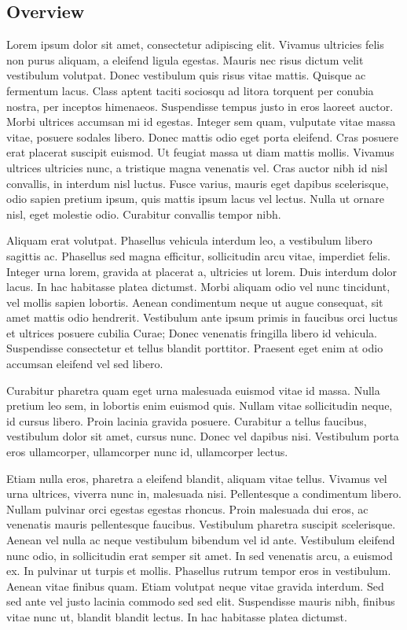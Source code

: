\documentclass[12pt,letterpaper]{article}
\begin{document}
\subsection{Overview}

Lorem ipsum dolor sit amet, consectetur adipiscing elit.
Vivamus ultricies felis non purus aliquam, a eleifend ligula egestas.
Mauris nec risus dictum velit vestibulum volutpat. Donec vestibulum
quis risus vitae mattis. Quisque ac fermentum lacus. Class aptent
taciti sociosqu ad litora torquent per conubia nostra, per inceptos
himenaeos. Suspendisse tempus justo in eros laoreet auctor. Morbi
ultrices accumsan mi id egestas. Integer sem quam, vulputate vitae
massa vitae, posuere sodales libero. Donec mattis odio eget porta
eleifend. Cras posuere erat placerat suscipit euismod. Ut feugiat
massa ut diam mattis mollis. Vivamus ultrices ultricies nunc, a tristique
magna venenatis vel. Cras auctor nibh id nisl convallis, in interdum
nisl luctus. Fusce varius, mauris eget dapibus scelerisque, odio sapien
pretium ipsum, quis mattis ipsum lacus vel lectus. Nulla ut ornare
nisl, eget molestie odio. Curabitur convallis tempor nibh.

Aliquam erat volutpat. Phasellus vehicula interdum leo, a
vestibulum libero sagittis ac. Phasellus sed magna efficitur, sollicitudin
arcu vitae, imperdiet felis. Integer urna lorem, gravida at placerat
a, ultricies ut lorem. Duis interdum dolor lacus. In hac habitasse
platea dictumst. Morbi aliquam odio vel nunc tincidunt, vel mollis
sapien lobortis. Aenean condimentum neque ut augue consequat, sit
amet mattis odio hendrerit. Vestibulum ante ipsum primis in faucibus
orci luctus et ultrices posuere cubilia Curae; Donec venenatis fringilla
libero id vehicula. Suspendisse consectetur et tellus blandit porttitor.
Praesent eget enim at odio accumsan eleifend vel sed libero.

Curabitur pharetra quam eget urna malesuada euismod vitae
id massa. Nulla pretium leo sem, in lobortis enim euismod quis. Nullam
vitae sollicitudin neque, id cursus libero. Proin lacinia gravida
posuere. Curabitur a tellus faucibus, vestibulum dolor sit amet, cursus
nunc. Donec vel dapibus nisi. Vestibulum porta eros ullamcorper,
ullamcorper nunc id, ullamcorper lectus.

Etiam nulla eros, pharetra a eleifend blandit, aliquam vitae
tellus. Vivamus vel urna ultrices, viverra nunc in, malesuada nisi.
Pellentesque a condimentum libero. Nullam pulvinar orci egestas egestas
rhoncus. Proin malesuada dui eros, ac venenatis mauris pellentesque
faucibus. Vestibulum pharetra suscipit scelerisque. Aenean vel nulla
ac neque vestibulum bibendum vel id ante. Vestibulum eleifend nunc
odio, in sollicitudin erat semper sit amet. In sed venenatis arcu,
a euismod ex. In pulvinar ut turpis et mollis. Phasellus rutrum tempor
eros in vestibulum. Aenean vitae finibus quam. Etiam volutpat neque
vitae gravida interdum. Sed sed ante vel justo lacinia commodo sed
sed elit. Suspendisse mauris nibh, finibus vitae nunc ut, blandit
blandit lectus. In hac habitasse platea dictumst.
\end{document}
